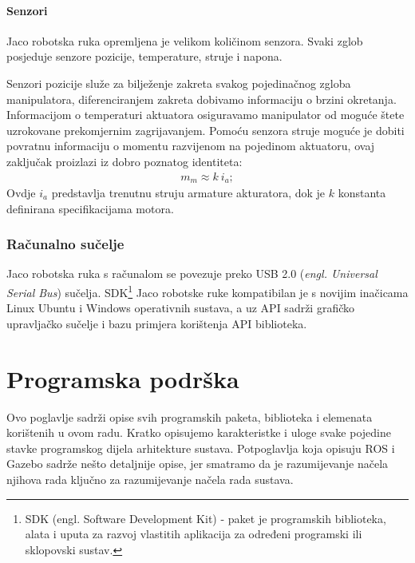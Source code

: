 \documentclass[times, utf8, diplomski, numeric]{fer}
\begin{document}
\subsubsection{Senzori}
Jaco robotska ruka opremljena je velikom količinom senzora.
Svaki zglob posjeduje senzore pozicije, temperature, struje i napona.
                                                                                                                            
Senzori pozicije služe za bilježenje zakreta svakog pojedinačnog zgloba manipulatora, diferenciranjem zakreta dobivamo informaciju o brzini okretanja.
Informacijom o temperaturi aktuatora osiguravamo manipulator od moguće štete uzrokovane prekomjernim zagrijavanjem.
Pomoću senzora struje moguće je dobiti povratnu informaciju o momentu razvijenom na pojedinom aktuatoru, ovaj zaključak proizlazi iz dobro poznatog identiteta:
\begin{align}
m_m \approx k \ i_a;
\end{align}
Ovdje $i_a$ predstavlja trenutnu struju armature akturatora, dok je $k$ konstanta definirana specifikacijama motora.


\subsection{Računalno sučelje}
Jaco robotska ruka s računalom se povezuje preko USB 2.0 (\textit{engl. Universal Serial Bus}) sučelja.
SDK\footnote{SDK (engl. Software Development Kit) - paket je programskih biblioteka, alata i uputa za razvoj vlastitih aplikacija za određeni programski ili sklopovski sustav.} Jaco robotske ruke kompatibilan je s novijim inačicama Linux Ubuntu i Windows operativnih sustava, a uz API sadrži grafičko upravljačko sučelje i bazu primjera korištenja API biblioteka.


\chapter{Programska podrška}
Ovo poglavlje sadrži opise svih programskih paketa, biblioteka i elemenata korištenih u ovom radu. 
Kratko opisujemo karakteristke i uloge svake pojedine stavke programskog dijela arhitekture sustava.
Potpoglavlja koja opisuju ROS i Gazebo sadrže nešto detaljnije opise, jer smatramo da je razumijevanje načela njihova rada ključno za razumijevanje načela rada sustava.
\end{document}

